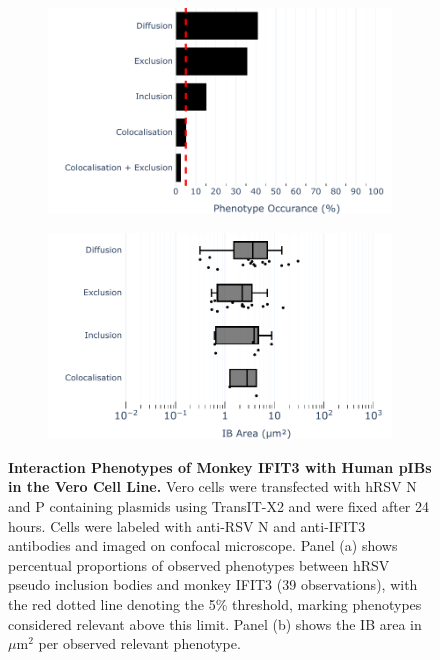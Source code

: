 \begin{figure}
    \begin{subfigure}{0.495\textwidth}
        \caption{}
        \includegraphics[width=1\linewidth]{09. Chapter 4/Figs/01. pIB/04. IFIT3/01. bar_i3_vero.pdf} 
    \end{subfigure}
    \begin{subfigure}{0.495\textwidth}
        \caption{}
        \includegraphics[width=1\linewidth]{09. Chapter 4/Figs/01. pIB/04. IFIT3/02. box_i3_vero.pdf}
    \end{subfigure}
    \caption[Interaction Phenotypes of Monkey IFIT3 with Human pIBs in the Vero Cell Line.]{\textbf{Interaction Phenotypes of Monkey IFIT3 with Human pIBs in the Vero Cell Line.} Vero cells were transfected with hRSV N and P containing plasmids using TransIT-X2 and were fixed after 24 hours. Cells were labeled with anti-RSV N and anti-IFIT3 antibodies and imaged on confocal microscope. Panel (a) shows percentual proportions of observed phenotypes between hRSV pseudo inclusion bodies and monkey IFIT3 (39 observations), with the red dotted line denoting the 5\% threshold, marking phenotypes considered relevant above this limit. Panel (b) shows the IB area in \(\mu \mbox{m}^2\) per observed relevant phenotype.}
    \label{fig:Interaction Phenotypes of Monkey IFIT3 with Human pIBs in the VERO Cell Line}
\end{figure}

